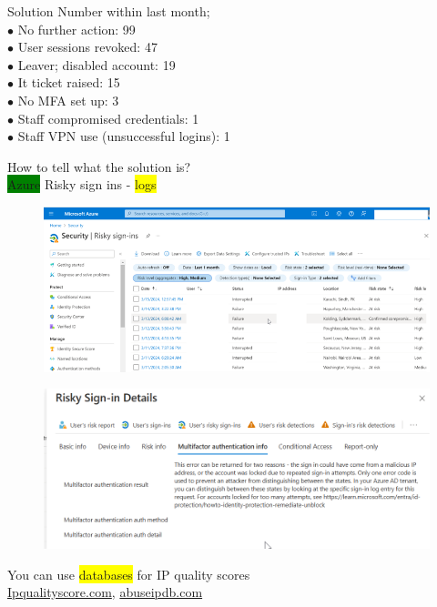 \documentclass[tikz,border=10pt]{project_plan}
\newcommand{\bulletPoint}{\hspace{-3.1pt}$\bullet$ \hspace{5pt}}
\begin{document}
Solution Number within last month;\\
\bulletPoint No further action: 99 \\
\bulletPoint User sessions revoked: 47 \\
\bulletPoint Leaver; disabled account: 19\\
\bulletPoint It ticket raised: 15 \\
\bulletPoint No MFA set up: 3 \\
\bulletPoint Staff compromised credentials: 1 \\
\bulletPoint Staff VPN use (unsuccessful logins): 1

How to tell what the solution is?\\
\colorbox{green}{Azure} Risky sign ins - \colorbox{yellow}{logs}

\begin{figure}[H]
  \centering
  \includegraphics[width=\linewidth]{azure sign ins.png}
\end{figure}

\begin{figure}[H]
  \centering
  \includegraphics[width=\linewidth]{azure risky sign ins.png}
\end{figure}

You can use \colorbox{yellow}{databases} for IP quality scores\\
\url{Ipqualityscore.com}, \url{abuseipdb.com}
\end{document}
